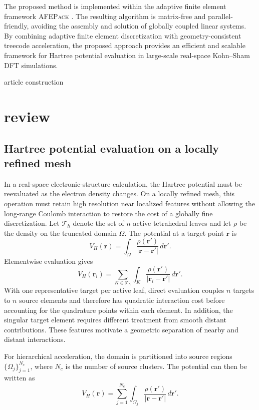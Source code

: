\documentclass[a4paper,10pt]{article}
\begin{document}
The proposed method is implemented within the adaptive finite element framework \textsc{AFEPack}
\cite{AFEPack}. The resulting algorithm is matrix-free and parallel-friendly, avoiding the assembly and solution of globally coupled linear systems. By combining adaptive finite element discretization with geometry-consistent treecode acceleration, the proposed approach provides an efficient and scalable framework for Hartree potential evaluation in large-scale real-space Kohn--Sham DFT simulations.

article construction

\section{review}
\label{sec:motivation}

\subsection{Hartree potential evaluation on a locally refined mesh}

In a real-space electronic-structure calculation, the Hartree potential
must be reevaluated as the electron density changes.  On a locally refined
mesh, this operation must retain high resolution near localized features
without allowing the long-range Coulomb interaction to restore the cost of
a globally fine discretization.  Let \(\mathcal T_h\) denote the set of
\(n\) active tetrahedral leaves and let \(\rho\) be the density on the
truncated domain \(\Omega\).  The potential at a target point
\(\mathbf r\) is
\[
V_H(\mathbf r)
=
\int_{\Omega}
\frac{\rho(\mathbf r')}
{\vert \mathbf r - \mathbf r' \vert}
\, d\mathbf r'.
\]
Elementwise evaluation gives
\[
V_H(\mathbf r_i)
=
\sum_{K\in\mathcal T_h}
\int_K
\frac{\rho(\mathbf r')}{|\mathbf r_i-\mathbf r'|}
\,d\mathbf r'.
\]
With one representative target per active leaf, direct evaluation couples
\(n\) targets to \(n\) source elements and therefore has quadratic
interaction cost before accounting for the quadrature points within each
element.  In addition, the singular target element requires different
treatment from smooth distant contributions.  These features motivate a
geometric separation of nearby and distant interactions.

For hierarchical acceleration, the domain is partitioned into source
regions $\{\Omega_j\}_{j=1}^{N_c}$, where $N_c$ is the number of source
clusters.  The potential can then be written as
\[
V_H(\mathbf r)
=
\sum_{j=1}^{N_c}
\int_{\Omega_j}
\frac{\rho(\mathbf r')}
{\vert \mathbf r - \mathbf r' \vert}
\, d\mathbf r'.
\]
\end{document}
